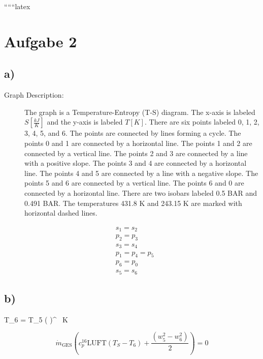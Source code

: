 
``````latex


\section*{Aufgabe 2}

\subsection*{a)}

\begin{description}
    \item[Graph Description:] The graph is a Temperature-Entropy (T-S) diagram. The x-axis is labeled $S \left[ \frac{kJ}{K} \right]$ and the y-axis is labeled $T \left[ K \right]$. There are six points labeled 0, 1, 2, 3, 4, 5, and 6. The points are connected by lines forming a cycle. The points 0 and 1 are connected by a horizontal line. The points 1 and 2 are connected by a vertical line. The points 2 and 3 are connected by a line with a positive slope. The points 3 and 4 are connected by a horizontal line. The points 4 and 5 are connected by a line with a negative slope. The points 5 and 6 are connected by a vertical line. The points 6 and 0 are connected by a horizontal line. There are two isobars labeled 0.5 BAR and 0.491 BAR. The temperatures 431.8 K and 243.15 K are marked with horizontal dashed lines.
\end{description}

\[
\begin{aligned}
    &s_1 = s_2 \\
    &p_2 = p_3 \\
    &s_3 = s_4 \\
    &p_1 = p_4 = p_5 \\
    &p_6 = p_0 \\
    &s_5 = s_6
\end{aligned}
\]

\subsection*{b)}

 \quad T_6 = T_5 \left(  \right)^{}  \, K



\[
\dot{m}_{\text{GES}} \left( c_p^{16} \text{LUFT} \left( T_S - T_6 \right) + \frac{(w_5^2 - w_6^2)}{2} \right) = 0
\]

